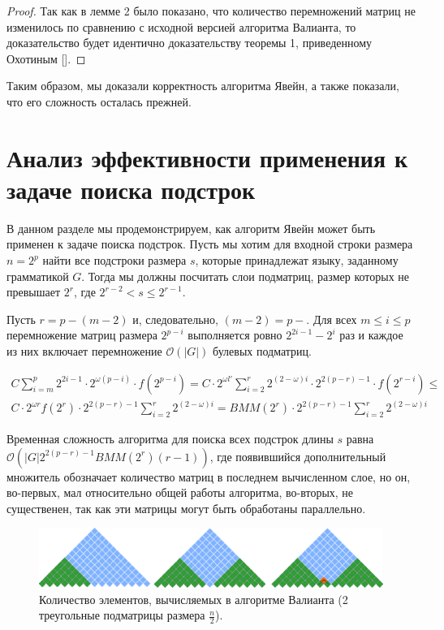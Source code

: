\documentclass[14pt]{matmex-diploma-custom}
\begin{document}
\begin{proof}
Так как в лемме 2 было показано, что количество перемножений матриц не изменилось по сравнению с исходной версией алгоритма Валианта, то доказательство будет идентично доказательству теоремы 1, приведенному Охотиным [].
\end{proof}

Таким образом, мы доказали корректность алгоритма Явейн, а также показали, что его сложность осталась прежней.


\section{Анализ эффективности применения к задаче поиска подстрок}

В данном разделе мы продемонстрируем, как алгоритм Явейн может быть применен к задаче поиска подстрок.
Пусть мы хотим для входной строки размера $n = 2^p$ найти все подстроки размера $s$, которые принадлежат языку, заданному грамматикой $G$.
Тогда мы должны посчитать слои подматриц, размер которых не превышает $2^{r}$, где $2^{r - 2} < s \le 2^{r - 1}$.

Пусть $r = p - (m - 2)$ и, следовательно, $(m - 2) = p - $.
Для всех  $m \le i \le p$ перемножение матриц размера $2^{p - i}$ выполняется ровно $2^{2i - 1} - 2^{i}$ раз и каждое из них включает перемножение $\mathcal{O}(|G|)$ булевых подматриц.

\begin{equation*}
\begin{array}{c}
C \sum\limits_{i=m}^p 2^{2i - 1} \cdot 2^{\omega(p - i)} \cdot f(2^{p - i}) =
C \cdot 2^{\omega l'}\sum\limits_{i=2}^{r} 2^{(2 - \omega)i} \cdot 2^{2(p - r) - 1} \cdot f(2^{r - i}) \le \\
C \cdot 2^{\omega r} f(2^{r}) \cdot 2^{2(p - r) - 1} \sum\limits_{i=2}^{r} 2^{(2 - \omega)i} =
BMM(2^{r}) \cdot 2^{2(p - r) - 1} \sum\limits_{i=2}^{r} 2^{(2 - \omega)i}
\end{array}
\end{equation*}

Временная сложность алгоритма для поиска всех подстрок длины $s$ равна $\mathcal{O}(|G|2^{2(p - r) - 1}BMM(2^{r})(r - 1))$, где появившийся дополнительный множитель обозначает количество матриц в последнем вычисленном слое, но он, во-первых, мал относительно общей работы алгоритма, во-вторых, не существенен, так как эти матрицы могут быть обработаны параллельно. 

\begin{figure}[h]
\vspace{3mm}
 \begin{center}
 \includegraphics[width=12cm]{valsubstring.pdf}
    \caption{Количество элементов, вычисляемых в алгоритме Валианта (2 треугольные подматрицы размера $\frac{n}{2}$).}
    \label{fig5}
 \end{center}
\vspace{-8mm}
\end{figure}
\end{document}
